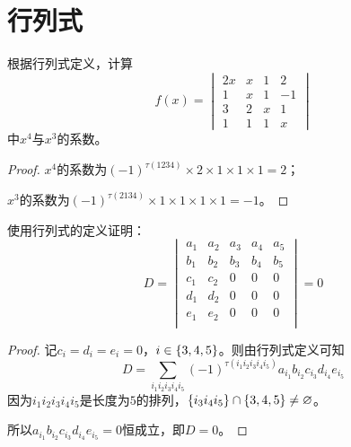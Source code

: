 \section{行列式}


\begin{problem}
根据行列式定义，计算
\begin{equation*}
    f(x)=
    \begin{vmatrix}
        2x & x & 1 & 2  \\
        1  & x & 1 & -1 \\
        3  & 2 & x & 1  \\
        1  & 1 & 1 & x
    \end{vmatrix}
\end{equation*}
中\(x^4\)与\(x^3\)的系数。
\end{problem}
\begin{proof}
    \(x^4\)的系数为\((-1)^{\tau(1234)}\times2\times1\times1\times1=2\)；

    \(x^3\)的系数为\((-1)^{\tau(2134)}\times1\times1\times1\times1=-1\)。
\end{proof}

\begin{problem}
使用行列式的定义证明：
\begin{equation*}
    D=
    \begin{vmatrix}
        a_1 & a_2 & a_3 & a_4 & a_5 \\
        b_1 & b_2 & b_3 & b_4 & b_5 \\
        c_1 & c_2 & 0   & 0   & 0   \\
        d_1 & d_2 & 0   & 0   & 0   \\
        e_1 & e_2 & 0   & 0   & 0   \\
    \end{vmatrix}=0
\end{equation*}
\end{problem}
\begin{proof}
    记\(c_i=d_i=e_i=0\)，\(i\in\left\{3,4,5 \right\}\)。则由行列式定义可知
    \begin{equation*}
        D=\sum_{i_1i_2i_3i_4i_5}(-1)^{\tau(i_1i_2i_3i_4i_5)}a_{i_1}b_{i_2}c_{i_3}d_{i_4}e_{i_5}
    \end{equation*}
    因为\(i_1i_2i_3i_4i_5\)是长度为\(5\)的排列，\(\left\{i_3i_4i_5 \right\}\cap\left\{3,4,5 \right\}\neq\varnothing\)。

    所以\(a_{i_1}b_{i_2}c_{i_3}d_{i_4}e_{i_5}=0\)恒成立，即\(D=0\)。
\end{proof}


